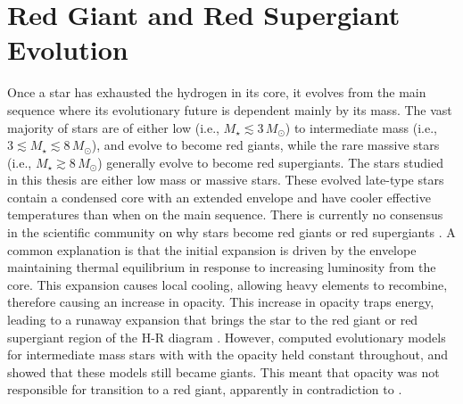 \section{Red Giant and Red Supergiant Evolution}\label{sec:1.5}
Once a star has exhausted the hydrogen in its core, it evolves from the main sequence where its evolutionary future is dependent mainly by its mass. The vast majority of stars are of either low (i.e., $M_{\star} \lesssim 3\,M_{\odot}$) to intermediate mass (i.e., $ 3 \lesssim M_{\star} \lesssim 8\,M_{\odot}$), and evolve to become red giants, while the rare massive stars (i.e., $M_{\star} \gtrsim 8\,M_{\odot}$) generally evolve to become red supergiants. The stars studied in this thesis are either low mass or massive stars. These evolved late-type stars contain a condensed core with an extended envelope and have cooler effective temperatures than when on the main sequence. There is currently no consensus in the scientific community on why stars become red giants or red supergiants \citep[e.g.,][]{sugimoto_2000,stancliffe_2009}. A common explanation is that the initial expansion is driven by the envelope maintaining thermal equilibrium in response to increasing luminosity from the core. This expansion causes local cooling, allowing heavy elements to recombine, therefore causing an increase in opacity. This increase in opacity traps energy, leading to a runaway expansion that brings the star to the red giant or red supergiant region of the H-R diagram \citep{renzini_1992}. However, \cite{iben_1993} computed evolutionary models for intermediate mass stars with with the opacity held constant throughout, and showed that these models still became giants. This meant that opacity was not responsible for transition to a red giant, apparently in contradiction to \cite{renzini_1992}. 


